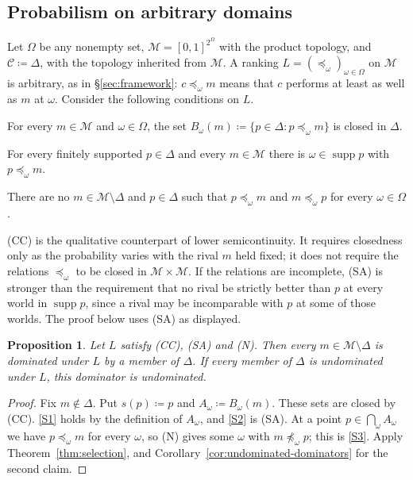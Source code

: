 \documentclass[11pt]{article}
\newenvironment{chgblockb}{\color{violet}}{}
\newtheorem{proposition}[theorem]{Proposition}
\theoremstyle{definition}
\theoremstyle{remark}
\newcommand{\M}{\mathcal M}
\newcommand{\C}{\mathcal C}
\newcommand{\supp}{\operatorname{supp}}
\begin{document}
\subsection{Probabilism on arbitrary domains}\label{sec:probabilism}

\begin{chgblockb}
Let $\Omega$ be any nonempty set, $\M=[0,1]^{2^\Omega}$ with the product topology, and $\C\coloneqq\Delta$, with the topology inherited from $\M$. A ranking $L=(\preceq_\omega)_{\omega\in\Omega}$ on $\M$ is arbitrary, as in \S\ref{sec:framework}: $c\preceq_\omega m$ means that $c$ performs at least as well as $m$ at $\omega$. Consider the following conditions on $L$.
\begin{description}[leftmargin=1.5em,font=\normalfont\bfseries]
\item[(CC) Closed comparisons.] For every $m\in\M$ and $\omega\in\Omega$, the set $B_\omega(m)\coloneqq\{p\in\Delta:p\preceq_\omega m\}$ is closed in $\Delta$.
\item[(SA) Support coverage.] For every finitely supported $p\in\Delta$ and every $m\in\M$ there is $\omega\in\supp p$ with $p\preceq_\omega m$.
\item[(N) No incoherent ties.] There are no $m\in\M\setminus\Delta$ and $p\in\Delta$ such that $p\preceq_\omega m$ and $m\preceq_\omega p$ for every $\omega\in\Omega$.
\end{description}
(CC) is the qualitative counterpart of lower semicontinuity. It requires closedness only as the probability varies with the rival $m$ held fixed; it does not require the relations $\preceq_\omega$ to be closed in $\M\times\M$. If the relations are incomplete, (SA) is stronger than the requirement that no rival be strictly better than $p$ at every world in $\supp p$, since a rival may be incomparable with $p$ at some of those worlds. The proof below uses (SA) as displayed.

\begin{proposition}\label{prop:probabilism}
Let $L$ satisfy (CC), (SA) and (N). Then every $m\in\M\setminus\Delta$ is dominated under $L$ by a member of $\Delta$. If every member of $\Delta$ is undominated under $L$, this dominator is undominated.
\end{proposition}
\begin{proof}
Fix $m\notin\Delta$. Put $s(p)\coloneqq p$ and $A_\omega\coloneqq B_\omega(m)$. These sets are closed by (CC). \ref{S1} holds by the definition of $A_\omega$, and \ref{S2} is (SA). At a point $p\in\bigcap_\omega A_\omega$ we have $p\preceq_\omega m$ for every $\omega$, so (N) gives some $\omega$ with $m\not\preceq_\omega p$; this is \ref{S3}. Apply Theorem~\ref{thm:selection}, and Corollary~\ref{cor:undominated-dominators} for the second claim.
\end{proof}


\end{chgblockb}
\end{document}
